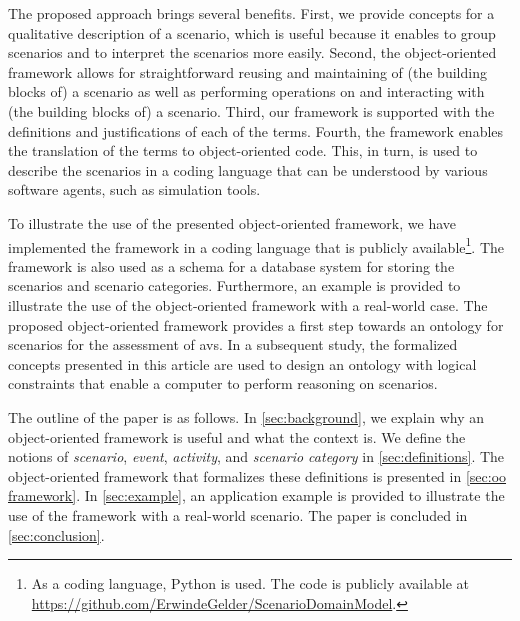 The proposed approach brings several benefits.
First, we provide concepts for a qualitative description of a scenario, which is useful because it enables to group scenarios and to interpret the scenarios more easily. 
Second, the object-oriented framework allows for straightforward reusing and maintaining of (the building blocks of) a scenario as well as performing operations on and interacting with (the building blocks of) a scenario.
Third, our framework is supported with the definitions and justifications of each of the terms.
Fourth, the framework enables the translation of the terms to object-oriented code.
This, in turn, is used to describe the scenarios in a coding language that can be understood by various software agents, such as simulation tools. 

To illustrate the use of the presented object-oriented framework, we have implemented the framework in a coding language that is publicly available\footnote{As a coding language, Python is used. The code is publicly available at \url{https://github.com/ErwindeGelder/ScenarioDomainModel}.}.
The framework is also used as a schema for a database system for storing the scenarios and scenario categories.
Furthermore, an example is provided to illustrate the use of the object-oriented framework with a real-world case.
The proposed object-oriented framework provides a first step towards an ontology for scenarios for the assessment of \acp{av}. In a subsequent study, the formalized concepts presented in this article are used to design an ontology with logical constraints that enable a computer to perform reasoning on scenarios.
\cendc

The outline of the paper is as follows. In \cref{sec:background}, we explain why an \cstartb object-oriented framework \cendb is useful and what the context is. 
We define the notions of \emph{scenario}, \emph{event}, \emph{activity}, and \emph{scenario category}  in \cref{sec:definitions}. 
The \cstartb object-oriented framework \cendb that formalizes these definitions is presented in \cref{sec:oo framework}. 
In \cref{sec:example}, an application example is provided to illustrate the use of the \cstartb framework \cendb with a real-world scenario. 
The paper is concluded in \cref{sec:conclusion}.
